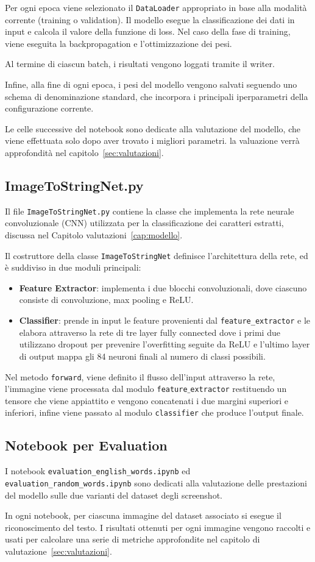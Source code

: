Per ogni epoca viene selezionato il \texttt{DataLoader} appropriato in base alla modalità corrente (training o validation).  
Il modello esegue la classificazione dei dati in input e calcola il valore della funzione di loss.  
Nel caso della fase di training, viene eseguita la backpropagation e l'ottimizzazione dei pesi.

Al termine di ciascun batch, i risultati vengono loggati tramite il writer.

Infine, alla fine di ogni epoca, i pesi del modello vengono salvati seguendo uno schema di denominazione standard, che incorpora i principali iperparametri della configurazione corrente.

Le celle successive del notebook sono dedicate alla valutazione del modello, che viene effettuata solo dopo aver trovato i migliori parametri. la valuazione verrà approfondità nel capitolo~\ref{sec:valutazioni}.

\subsection{ImageToStringNet.py}
Il file \texttt{ImageToStringNet.py} contiene la classe che implementa la rete neurale convoluzionale (CNN) utilizzata per la classificazione dei caratteri estratti, discussa nel Capitolo valutazioni~\ref{cap:modello}. 

Il costruttore della classe \texttt{ImageToStringNet} definisce l'architettura della rete, ed è suddiviso in due moduli principali:
\begin{itemize}
    \item \textbf{Feature Extractor}: implementa i due blocchi convoluzionali, dove ciascuno consiste di convoluzione, max pooling e ReLU.
    \item \textbf{Classifier}: prende in input le feature provenienti dal \texttt{feature\_extractor} e le elabora attraverso la rete di tre layer fully connected dove i primi due utilizzano dropout per prevenire l'overfitting seguite da ReLU e l'ultimo layer di output mappa gli 84 neuroni finali al numero di classi possibili.
\end{itemize}

Nel metodo \texttt{forward}, viene definito il flusso dell'input attraverso la rete, l'immagine viene processata dal modulo \texttt{feature$\_$extractor} restituendo un tensore che viene appiattito e vengono concatenati i due margini superiori e inferiori, infine viene passato al modulo \texttt{classifier} che produce l'output finale.

\subsection{Notebook per Evaluation}
I notebook \texttt{evaluation\_english\_words.ipynb} ed \\  \texttt{evaluation\_random\_words.ipynb} sono dedicati alla valutazione delle prestazioni del modello sulle due varianti del dataset degli screenshot. 

In ogni notebook, per ciascuna immagine del dataset associato si esegue il riconoscimento del testo. I risultati ottenuti per ogni immagine vengono raccolti e usati per calcolare una serie di metriche approfondite nel capitolo di valutazione~\ref{sec:valutazioni}.